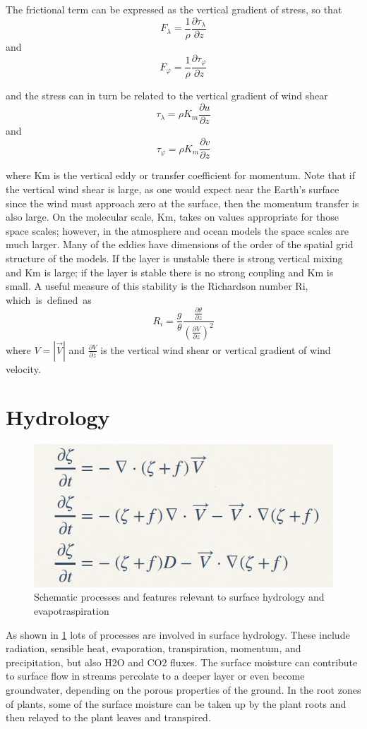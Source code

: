 The frictional term can be expressed as the vertical gradient of stress, so that $$F_\lambda = \frac{1}{\rho} \frac{\partial \tau_\lambda}{\partial z}$$
and $$F_\varphi = \frac{1}{\rho} \frac{\partial \tau_\varphi}{\partial z}$$


and the stress can in turn be related to the vertical gradient of wind shear
$$\tau_\lambda = \rho K_m \frac{\partial u}{\partial z}$$
and $$\tau_\varphi = \rho K_m \frac{\partial v}{\partial z}$$

where Km is the vertical eddy or transfer coefficient for momentum. Note that if the vertical wind shear is large, as one would expect near the Earth's surface since the wind must approach zero at the surface, then the momentum transfer is also large. On the molecular scale, Km, takes on values appropriate for those space scales; however, in the atmosphere and ocean models the space scales are much larger. Many of the eddies have dimensions of the order of the spatial grid structure of the models.
If the layer is unstable there is strong vertical mixing and Km is large; if the layer is stable there is no strong coupling and Km is small. A useful measure of this stability is the Richardson number Ri, which is defined as
$$R_i = \frac{g}{\theta} \frac{\frac{\partial \theta}{\partial z}}{\left( \frac{\partial V}{\partial z} \right)^2}$$
where $V = \left| \vec{V} \right|$ and $\frac{\partial V}{\partial z}$ is the vertical wind shear or vertical gradient of wind velocity.

\section{Hydrology}
\begin{figure}[h!]
	\centering
	\includegraphics[width=0.5\linewidth]{uploads/15image.png}
	\caption{Schematic processes and features relevant to surface hydrology and evapotraspiration}
	\label{fig: fig 2}
\end{figure}
As shown in \ref{fig: fig 2} lots of processes are involved in surface hydrology. These include radiation, sensible heat, evaporation, transpiration, momentum, and precipitation, but also H2O and CO2 fluxes. The surface moisture can contribute to surface flow in streams percolate to a deeper layer or even become groundwater, depending on the porous properties of the ground. In the root zones of plants, some of the surface moisture can be taken up by the plant roots and then relayed to the plant leaves and transpired.

